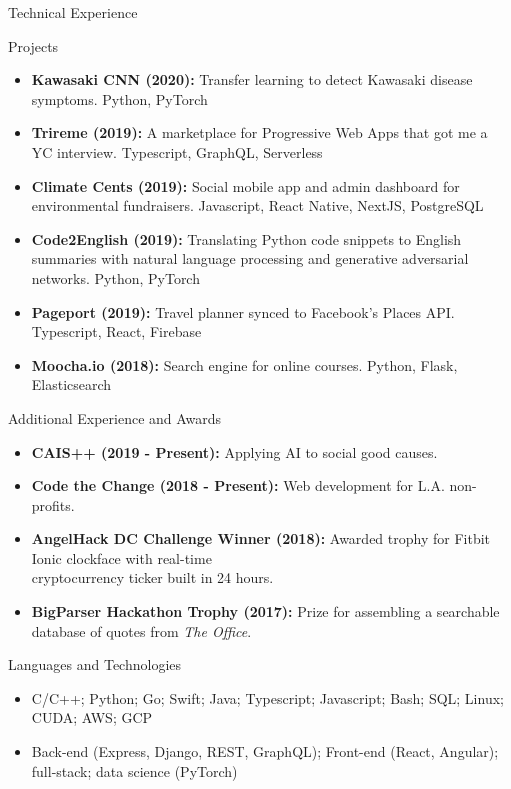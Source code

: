 \documentclass[calibri]{mcdowellcv}
\begin{document}
\begin{cvsection}{Technical Experience}
	\begin{cvsubsection}{Projects}{}{}
		\begin{itemize}
			\item \textbf{Kawasaki CNN (2020):} Transfer learning to detect Kawasaki disease symptoms. Python, PyTorch
			\item \textbf{Trireme (2019):} A marketplace for Progressive Web Apps that got me a YC interview. Typescript, GraphQL, Serverless
			\item \textbf{Climate Cents (2019):} Social mobile app and admin dashboard for environmental fundraisers. Javascript, React Native, NextJS, PostgreSQL
			\item \textbf{Code2English (2019):} Translating Python code snippets to English summaries with natural language processing and generative adversarial networks. Python, PyTorch
			\item \textbf{Pageport (2019):} Travel planner synced to Facebook's Places API. Typescript, React, Firebase
			\item \textbf{Moocha.io (2018):} Search engine for online courses. Python, Flask, Elasticsearch
		\end{itemize}
	\end{cvsubsection}
\end{cvsection}

\begin{cvsection}{Additional Experience and Awards}
	\begin{cvsubsection}{}{}{}
		\begin{itemize}
			\item \textbf{CAIS++ (2019 - Present):} Applying AI to social good causes.
			\item \textbf{Code the Change (2018 - Present):} Web development for L.A. non-profits.
			\item \textbf{AngelHack DC Challenge Winner (2018):} Awarded trophy for Fitbit Ionic clockface with real-time \\cryptocurrency ticker built in 24 hours.
			\item \textbf{BigParser Hackathon Trophy (2017):} Prize for assembling a searchable database of quotes from \textit{The Office}.
		\end{itemize}
	\end{cvsubsection}
\end{cvsection}

\begin{cvsection}{Languages and Technologies}
	\begin{cvsubsection}{}{}{}
		\begin{itemize}
			\item C/C++; Python; Go; Swift; Java; Typescript; Javascript; Bash; SQL; Linux; CUDA; AWS; GCP
			\item Back-end (Express, Django, REST, GraphQL); Front-end (React, Angular); full-stack; data science (PyTorch)
		\end{itemize}
	\end{cvsubsection}
\end{cvsection}
\end{document}
